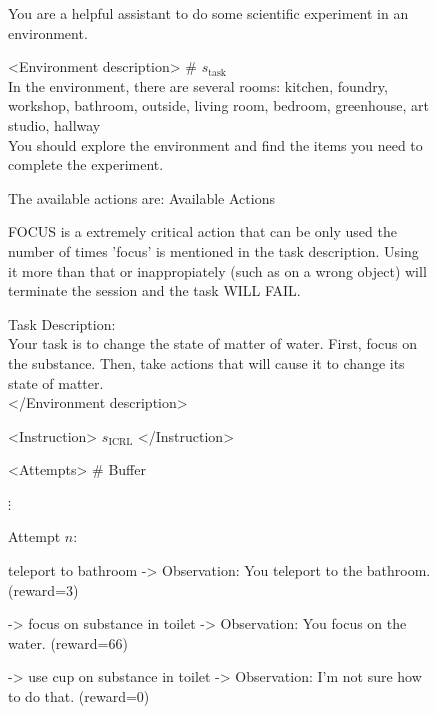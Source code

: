\documentclass{article} %
\newcommand{\0}{\mathbf{0}}
\begin{document}
\begin{figure}[H]
  \centering
  \begin{tcolorbox}[
      colback=gray!5!white, 
      colframe=black!100!black, 
      width=1\textwidth
  ]
  \small
  
You are a helpful assistant to do some scientific experiment in an environment.

<Environment description> \# {\color{red}$s_\text{task}$} \\
In the environment, there are several rooms: kitchen, foundry, workshop, bathroom, outside, living room, bedroom, greenhouse, art studio, hallway  \\
You should explore the environment and find the items you need to complete the experiment.  

\vspace{.25cm}
The available actions are: 
{Available Actions}


\vspace{.25cm}

FOCUS is a extremely critical action that can be only used the number of times 'focus' is mentioned in the task description. Using it more than that or inappropiately (such as on a wrong object) will terminate the session and the task WILL FAIL.
\vspace{.25cm}

Task Description: \\
Your task is to change the state of matter of water. First, focus on the substance. Then, take actions that will cause it to change its state of matter. \\
</Environment description>

\vspace{.25cm}
<Instruction>
{\color{red}$s_\text{ICRL}$}
</Instruction>
\vspace{.25cm}

<Attempts> \# {\color{red}Buffer}

\vspace{.25cm}
$\vdots$
\vspace{.25cm}

Attempt $n$:

teleport to bathroom -> Observation: You teleport to the bathroom. (reward=3)

-> focus on substance in toilet -> Observation: You focus on the water. (reward=66)

-> use cup on substance in toilet -> Observation: I'm not sure how to do that. (reward=0)


\end{tcolorbox}
\end{figure}
\end{document}
